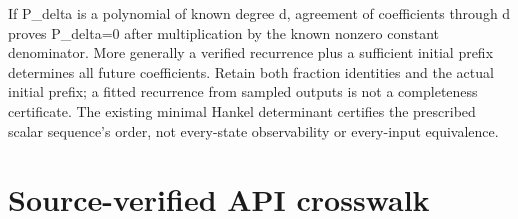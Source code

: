 \documentclass[
  11pt,
  a4paper,
]{report}
\begin{document}
If P\_delta is a polynomial of known degree d, agreement of coefficients
through d proves P\_delta=0 after multiplication by the known nonzero
constant denominator. More generally a verified recurrence plus a
sufficient initial prefix determines all future coefficients. Retain
both fraction identities and the actual initial prefix; a fitted
recurrence from sampled outputs is not a completeness certificate. The
existing minimal Hankel determinant certifies the prescribed scalar
sequence's order, not every-state observability or every-input
equivalence.

\hypertarget{source-verified-api-crosswalk-1}{%
\section{Source-verified API
crosswalk}\label{source-verified-api-crosswalk-1}}
\end{document}
